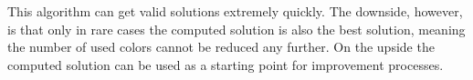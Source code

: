 \documentclass[paper = a4, fontsize = 10pt]{scrartcl}
\begin{document}
This algorithm can get valid solutions extremely quickly. The downside, however, is that only in rare cases the computed solution is also the best solution, meaning the number of used colors cannot be reduced any further. On the upside the computed solution can be used as a starting point for improvement processes.







\end{document}
